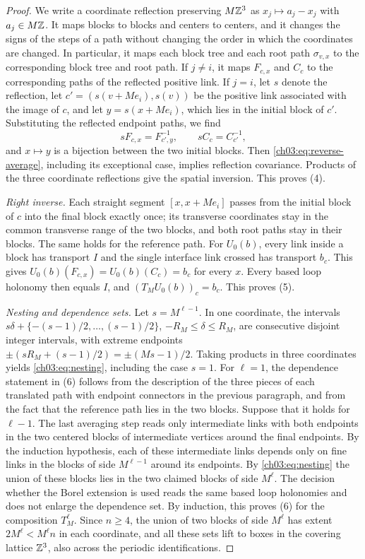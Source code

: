 \begin{proof}
We write a coordinate reflection preserving $M\mathbb Z^3$ as $x_j\mapsto a_j-x_j$ with $a_j\in M\mathbb Z$. It maps blocks to blocks and centers to centers, and it changes the signs of the steps of a path without changing the order in which the coordinates are changed. In particular, it maps each block tree and each root path $\sigma_{v,x}$ to the corresponding block tree and root path. If $j\ne i$, it maps $F_{c,x}$ and $C_c$ to the corresponding paths of the reflected positive link. If $j=i$, let $s$ denote the reflection, let $c'=(s(v+Me_i),s(v))$ be the positive link associated with the image of $c$, and let $y=s(x+Me_i)$, which lies in the initial block of $c'$. Substituting the reflected endpoint paths, we find
\[
 sF_{c,x}=F_{c',y}^{-1},\qquad sC_c=C_{c'}^{-1},
\]
and $x\mapsto y$ is a bijection between the two initial blocks. Then \eqref{ch03:eq:reverse-average}, including its exceptional case, implies reflection covariance. Products of the three coordinate reflections give the spatial inversion. This proves (4).

\emph{Right inverse.} Each straight segment $[x,x+Me_i]$ passes from the initial block of $c$ into the final block exactly once; its transverse coordinates stay in the common transverse range of the two blocks, and both root paths stay in their blocks. The same holds for the reference path. For $U_0(b)$, every link inside a block has transport $I$ and the single interface link crossed has transport $b_c$. This gives $U_0(b)(F_{c,x})=U_0(b)(C_c)=b_c$ for every $x$. Every based loop holonomy then equals $I$, and $(T_MU_0(b))_c=b_c$. This proves (5).

\emph{Nesting and dependence sets.} Let $s=M^{\ell-1}$. In one coordinate, the intervals $s\delta+\{-(s-1)/2,\dots,(s-1)/2\}$, $-R_M\le\delta\le R_M$, are consecutive disjoint integer intervals, with extreme endpoints $\pm(sR_M+(s-1)/2)=\pm(Ms-1)/2$. Taking products in three coordinates yields \eqref{ch03:eq:nesting}, including the case $s=1$. For $\ell=1$, the dependence statement in (6) follows from the description of the three pieces of each translated path with endpoint connectors in the previous paragraph, and from the fact that the reference path lies in the two blocks. Suppose that it holds for $\ell-1$. The last averaging step reads only intermediate links with both endpoints in the two centered blocks of intermediate vertices around the final endpoints. By the induction hypothesis, each of these intermediate links depends only on fine links in the blocks of side $M^{\ell-1}$ around its endpoints. By \eqref{ch03:eq:nesting} the union of these blocks lies in the two claimed blocks of side $M^\ell$. The decision whether the Borel extension is used reads the same based loop holonomies and does not enlarge the dependence set. By induction, this proves (6) for the composition $T_M^\ell$. Since $n\ge4$, the union of two blocks of side $M^\ell$ has extent $2M^\ell<M^\ell n$ in each coordinate, and all these sets lift to boxes in the covering lattice $\mathbb Z^3$, also across the periodic identifications.
\end{proof}

